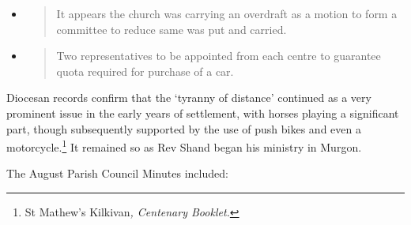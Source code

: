 \begin{itemize}
  \begin{itemize}
  \item
    Murgon \pounds64;
  \item
    Kilkivan \pounds53-10-0;
  \item
    Boonara \pounds40;
  \item
    Wondai \pounds35;
  \item
    Mondure \pounds58;
  \item
    Sexton \pounds12;
  \item
    Overseas \pounds12;
  \item
    Tingoora \pounds12\textbf{;}
  \item
    \textbf{TOTAL} \pounds326-10-0.
  \end{itemize}
\item
  \begin{quote}
  It appears the church was carrying an overdraft as a motion to form a
  committee to reduce same was put and carried.
  \end{quote}
\item
  \begin{quote}
  Two representatives to be appointed from each centre to guarantee
  quota required for purchase of a car.
  \end{quote}
\end{itemize}

Diocesan records confirm that the `tyranny of distance' continued as a
very prominent issue in the early years of settlement, with horses
playing a significant part, though subsequently supported by the use of
push bikes and even a motorcycle.\footnote{St Mathew's Kilkivan\emph{,
  Centenary Booklet.}} It remained so as Rev Shand began his ministry in
Murgon.

The August Parish Council Minutes included:

